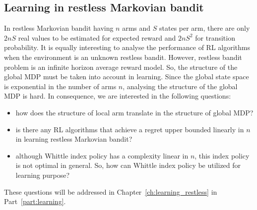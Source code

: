 \subsection{Learning in restless Markovian bandit}

In restless Markovian bandit having $n$ arms and $S$ states per arm, there are only $2nS$ real values to be estimated for expected reward and $2nS^2$ for transition probability.
It is equally interesting to analyse the performance of RL algorithms when the environment is an unknown restless bandit.
However, restless bandit problem is an infinite horizon average reward model.
So, the structure of the global MDP must be taken into account in learning.
Since the global state space is exponential in the number of arms $n$, analysing the structure of the global MDP is hard.
In consequence, we are interested in the following questions:
\begin{itemize}
    \item how does the structure of local arm translate in the structure of global MDP?
    \item is there any RL algorithms that achieve a regret upper bounded linearly in $n$ in learning restless Markovian bandit?
    \item although Whittle index policy has a complexity linear in $n$, this index policy is not optimal in general. So, how can Whittle index policy be utilized for learning purpose?
\end{itemize}
These questions will be addressed in Chapter~\ref{ch:learning_restless} in Part~\ref{part:learning}.

\endgroup

